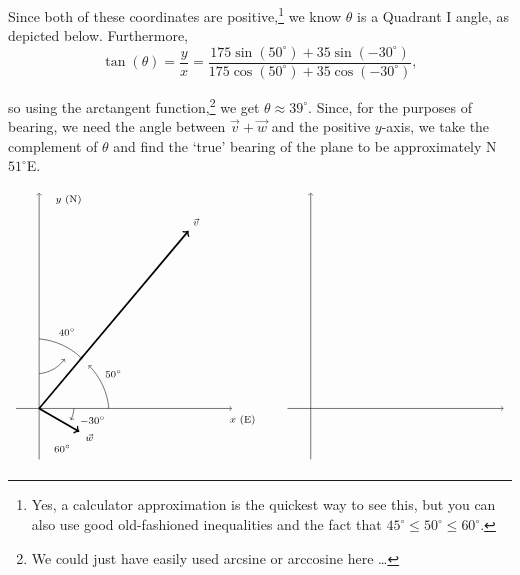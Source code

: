 \documentclass{ximera}
\begin{document}
\begin{example}
\begin{explanation}
  
 
 Since both of these coordinates are positive,\footnote{Yes, a calculator approximation is the quickest way to see this, but you can also use good old-fashioned inequalities and the fact that $45^{\circ} \leq 50^{\circ} \leq 60^{\circ}$.} we know $\theta$ is a Quadrant I angle, as depicted below.  Furthermore, \[\tan(\theta) = \frac{y}{x} = \frac{175\sin(50^{\circ}) + 35\sin(-30^{\circ})}{175\cos(50^{\circ}) + 35\cos(-30^{\circ})},\]

so using the arctangent function,\footnote{We could just have easily used arcsine or arccosine here \ldots} we get $\theta \approx 39^{\circ}$.  Since, for the purposes of bearing, we need the angle between $\overrightarrow{v} + \overrightarrow{w}$ and the positive $y$-axis, we take the complement of $\theta$ and find the `true' bearing of the plane to be approximately N$51^{\circ}$E.

\[
\begin{array}{cc}

\begin{tikzpicture}[scale=0.6]

\draw[->] (-1,0) -- (8.3,0);
\draw[->] (0,-2.2) -- (0,9.3);

\node[anchor=west] at (8,-0.5) {\scriptsize $x$ (E)};
\node[anchor=west] at (0.5,9) {\scriptsize $y$ (N)};

\draw[->] (0,3) ++(85:0) arc[start angle=85,end angle=45,radius=3];
\node at (1.2,3.3) {\scriptsize $40^\circ$};

\draw[->] (3,0) arc[start angle=5,end angle=45,radius=3];
\node at (3.2,1.5) {\scriptsize $50^\circ$};

\draw[->] (0,1.5) ++(275:0) arc[start angle=275,end angle=325,radius=1.5];
\node at (1,-1.73) {\scriptsize $60^\circ$};

\draw[->] (1.5,0) arc[start angle=-5,end angle=-25,radius=1.5];
\node at (2.3,-0.52) {\scriptsize $-30^\circ$};

\draw[->,line width=1.25pt] (0,0)--(6.43,7.66);
\node at (6.75,8.04) {\scriptsize $\vec v$};

\draw[->,line width=1.25pt] (0,0)--(1.73,-1);
\node at (2.16,-1.25) {\scriptsize $\vec w$};

\end{tikzpicture}

&\quad
\begin{tikzpicture}[scale=0.6]

\draw[->] (-1,0) -- (8.3,0);
\draw[->] (0,-2.2) -- (0,9.3);


\end{tikzpicture}
\end{array}\]
\end{explanation}
\end{example}
\end{document}
